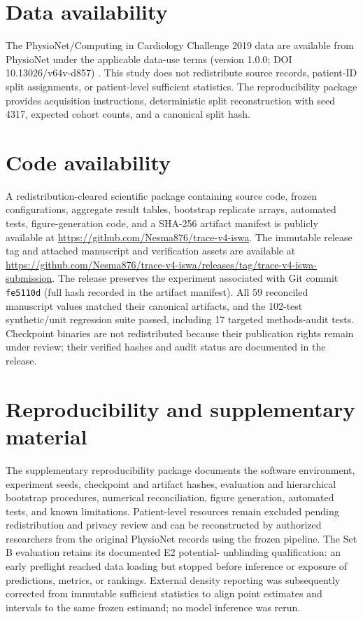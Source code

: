 \documentclass[preprint,12pt]{elsarticle}
\begin{document}
\section*{Data availability}
The PhysioNet/Computing in Cardiology Challenge 2019 data are available
from PhysioNet under the applicable data-use terms (version 1.0.0; DOI
10.13026/v64v-d857) \cite{reyna2020sepsis}. This study does not
redistribute source records, patient-ID split assignments, or
patient-level sufficient statistics. The reproducibility package
provides acquisition instructions, deterministic split reconstruction
with seed 4317, expected cohort counts, and a canonical split hash.

\section*{Code availability}
A redistribution-cleared scientific package containing source code,
frozen configurations, aggregate result tables, bootstrap replicate
arrays, automated tests, figure-generation code, and a SHA-256 artifact
manifest is publicly available at
\url{https://github.com/Nesma876/trace-v4-iswa}. The immutable release
tag and attached manuscript and verification assets are available at
\url{https://github.com/Nesma876/trace-v4-iswa/releases/tag/trace-v4-iswa-submission}.
The release preserves the experiment associated with Git commit
\texttt{fe5110d} (full hash recorded in the artifact manifest). All 59
reconciled manuscript values matched their canonical artifacts, and the
102-test synthetic/unit regression suite passed, including 17 targeted
methods-audit tests. Checkpoint binaries are not redistributed because
their publication rights remain under review; their verified hashes and
audit status are documented in the release.

\section*{Reproducibility and supplementary material}
The supplementary reproducibility package documents the software
environment, experiment seeds, checkpoint and artifact hashes,
evaluation and hierarchical bootstrap procedures, numerical
reconciliation, figure generation, automated tests, and known
limitations. Patient-level resources remain excluded pending
redistribution and privacy review and can be reconstructed by authorized
researchers from the original PhysioNet records using the frozen
pipeline. The Set B evaluation retains its documented E2 potential-
unblinding qualification: an early preflight reached data loading but
stopped before inference or exposure of predictions, metrics, or
rankings. External density reporting was subsequently corrected from
immutable sufficient statistics to align point estimates and intervals
to the same frozen estimand; no model inference was rerun.
\end{document}
